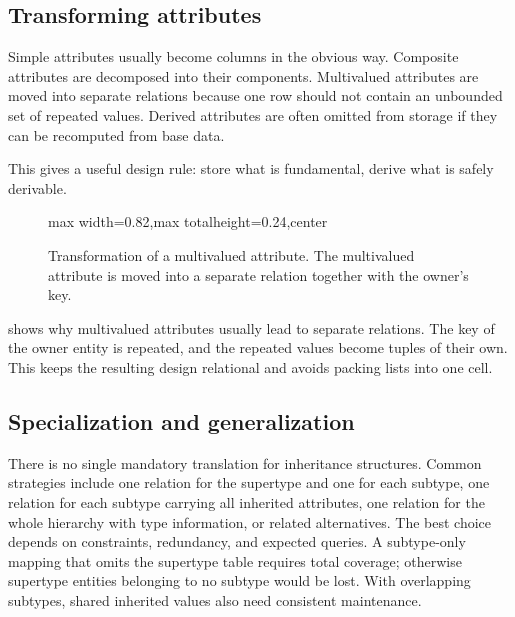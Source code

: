 \documentclass[11pt,a4paper,openany]{book}
\newcommand{\keyattr}[1]{\underline{#1}}
\begin{document}
\subsection{Transforming attributes}
Simple attributes usually become columns in the obvious way. Composite attributes are decomposed into their components. Multivalued attributes are moved into separate relations because one row should not contain an unbounded set of repeated values. Derived attributes are often omitted from storage if they can be recomputed from base data.

This gives a useful design rule: store what is fundamental, derive what is safely derivable.

\begin{figure}[tbp]
\centering
\begin{adjustbox}{max width=0.82\linewidth,max totalheight=0.24\textheight,center}
\end{adjustbox}
\caption{Transformation of a multivalued attribute. The multivalued attribute is moved into a separate relation together with the owner's key.}
\label{fig:rel-multivalued-rule}
\end{figure}

 shows why multivalued attributes usually lead to separate relations. The key of the owner entity is repeated, and the repeated values become tuples of their own. This keeps the resulting design relational and avoids packing lists into one cell.

\subsection{Specialization and generalization}
There is no single mandatory translation for inheritance structures. Common strategies include one relation for the supertype and one for each subtype, one relation for each subtype carrying all inherited attributes, one relation for the whole hierarchy with type information, or related alternatives. The best choice depends on constraints, redundancy, and expected queries. A subtype-only mapping that omits the supertype table requires total coverage; otherwise supertype entities belonging to no subtype would be lost. With overlapping subtypes, shared inherited values also need consistent maintenance.
\end{document}
